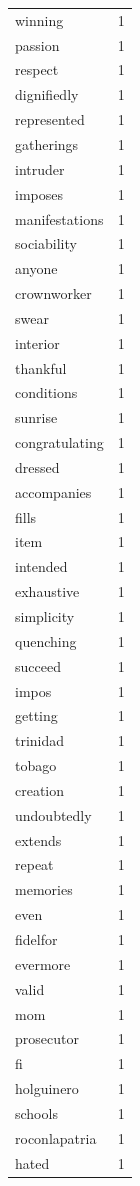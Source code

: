 \begin{tabular}{lr}
winning & 1 \\
passion & 1 \\
respect & 1 \\
dignifiedly & 1 \\
represented & 1 \\
gatherings & 1 \\
intruder & 1 \\
imposes & 1 \\
manifestations & 1 \\
sociability & 1 \\
anyone & 1 \\
crownworker & 1 \\
swear & 1 \\
interior & 1 \\
thankful & 1 \\
conditions & 1 \\
sunrise & 1 \\
congratulating & 1 \\
dressed & 1 \\
accompanies & 1 \\
fills & 1 \\
item & 1 \\
intended & 1 \\
exhaustive & 1 \\
simplicity & 1 \\
quenching & 1 \\
succeed & 1 \\
impos & 1 \\
getting & 1 \\
trinidad & 1 \\
tobago & 1 \\
creation & 1 \\
undoubtedly & 1 \\
extends & 1 \\
repeat & 1 \\
memories & 1 \\
even & 1 \\
fidelfor & 1 \\
evermore & 1 \\
valid & 1 \\
mom & 1 \\
prosecutor & 1 \\
fi & 1 \\
holguinero & 1 \\
schools & 1 \\
roconlapatria & 1 \\
hated & 1 \\

\end{tabular}
